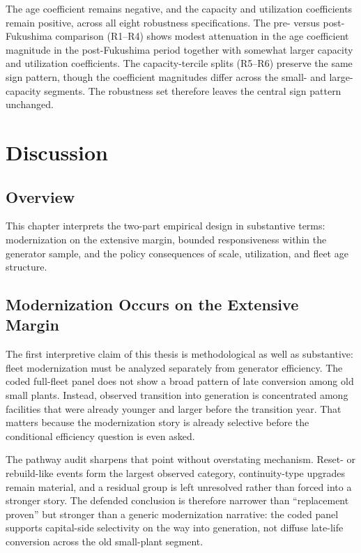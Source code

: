 \documentclass[12pt,a4paper]{article}
\begin{document}
\enlargethispage{2\baselineskip}
The age coefficient remains negative, and the capacity and utilization coefficients remain positive, across all eight robustness specifications. The pre- versus post-Fukushima comparison (R1--R4) shows modest attenuation in the age coefficient magnitude in the post-Fukushima period together with somewhat larger capacity and utilization coefficients. The capacity-tercile splits (R5--R6) preserve the same sign pattern, though the coefficient magnitudes differ across the small- and large-capacity segments. The robustness set therefore leaves the central sign pattern unchanged.


\clearpage
\section{Discussion}

\subsection{Overview}

This chapter interprets the two-part empirical design in substantive terms: modernization on the extensive margin, bounded responsiveness within the generator sample, and the policy consequences of scale, utilization, and fleet age structure.

\subsection{Modernization Occurs on the Extensive Margin}

The first interpretive claim of this thesis is methodological as well as substantive: fleet modernization must be analyzed separately from generator efficiency. The coded full-fleet panel does not show a broad pattern of late conversion among old small plants. Instead, observed transition into generation is concentrated among facilities that were already younger and larger before the transition year. That matters because the modernization story is already selective before the conditional efficiency question is even asked.

The pathway audit sharpens that point without overstating mechanism. Reset- or rebuild-like events form the largest observed category, continuity-type upgrades remain material, and a residual group is left unresolved rather than forced into a stronger story. The defended conclusion is therefore narrower than ``replacement proven'' but stronger than a generic modernization narrative: the coded panel supports capital-side selectivity on the way into generation, not diffuse late-life conversion across the old small-plant segment.
\end{document}
